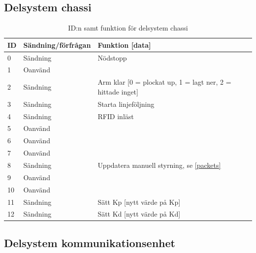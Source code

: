 \subsection{Delsystem chassi}

\begin{table}[H]
\centering
\label{callbacks-chassi}
\begin{tabularx}{\textwidth}{|l|l|X|}
\hline
\textbf{ID} & \textbf{Sändning/förfrågan} & \textbf{Funktion [data]} \\ \hline
0 & Sändning & Nödstopp \\ \hline
1 & Oanvänd & \\ \hline
2 & Sändning & Arm klar [0 = plockat up, 1 = lagt ner, 2 = hittade inget] \\ \hline
3 & Sändning & Starta linjeföljning \\ \hline
4 & Sändning & RFID inläst \\ \hline
5 & Oanvänd & \\ \hline
6 & Oanvänd & \\ \hline
7 & Oanvänd & \\ \hline
8 & Sändning & Uppdatera manuell styrning, se \ref{packets}\\ \hline
9 & Oanvänd & \\ \hline
10 & Oanvänd & \\ \hline
11 & Sändning & Sätt Kp [nytt värde på Kp] \\ \hline
12 & Sändning & Sätt Kd [nytt värde på Kd] \\ \hline
\end{tabularx}
\caption{ID:n samt funktion för delsystem chassi}
\end{table}

\subsection{Delsystem kommunikationsenhet}

